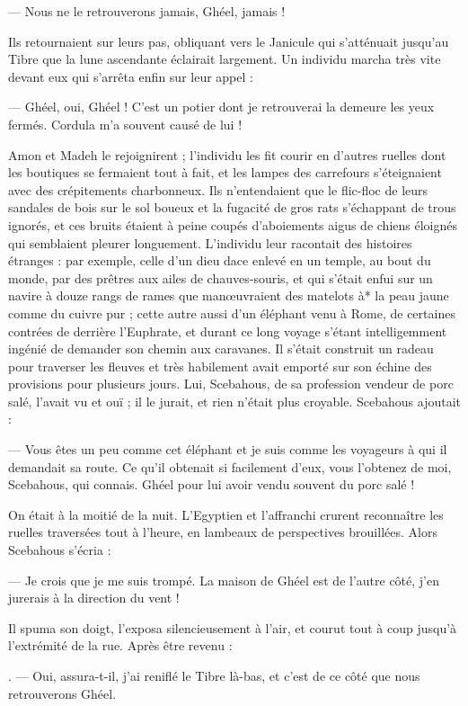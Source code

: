 \documentclass[a4paper, 11pt, oneside, polutonikogreek, french]{article}
\begin{document}
--- Nous ne le retrouverons jamais, Ghéel, jamais !

Ils retournaient sur leurs pas, obliquant vers le Janicule qui s'atténuait jusqu'au Tibre que la lune ascendante éclairait largement. Un individu marcha très vite devant eux qui s'arrêta enfin sur leur appel :

--- Ghéel, oui, Ghéel ! C'est un potier dont je retrouverai la demeure les yeux fermés. Cordula m'a souvent causé de lui !

Amon et Madeh le rejoignirent ; l'individu les fit courir en d'autres ruelles dont les boutiques se fermaient tout à fait, et les lampes des carrefours s'éteignaient avec des crépitements charbonneux. Ils n'entendaient que le flic-floc de leurs sandales de bois sur le sol boueux et la fugacité de gros rats s'échappant de trous ignorés, et ces bruits étaient à peine coupés d'aboiements aigus de chiens éloignés qui semblaient pleurer longuement. L'individu leur racontait des histoires étranges : par exemple, celle d'un dieu dace enlevé en un temple, au bout du monde, par des prêtres aux ailes de chauves-souris, et qui s'était enfui sur un navire à douze rangs de rames que manœuvraient des matelots à* la peau jaune comme du cuivre pur ; cette autre aussi d'un éléphant venu à Rome, de certaines contrées de derrière l'Euphrate, et durant ce long voyage s'étant intelligemment ingénié de demander son chemin aux caravanes. Il s'était construit un radeau pour traverser les fleuves et très habilement avait emporté sur son échine des provisions pour plusieurs jours. Lui, Scebahous, de sa profession vendeur de porc salé, l'avait vu et ouï ; il le jurait, et rien n'était plus croyable. Scebahous ajoutait :

--- Vous êtes un peu comme cet éléphant et je suis comme les voyageurs à qui il demandait sa route. Ce qu'il obtenait si facilement d'eux, vous l'obtenez de moi, Scebahous, qui connais. Ghéel pour lui avoir vendu souvent du porc salé !

On était à la moitié de la nuit. L'Egyptien et l'affranchi crurent reconnaître les ruelles traversées tout à l'heure, en lambeaux de perspectives brouillées. Alors Scebahous s'écria :

--- Je crois que je me suis trompé. La maison de Ghéel est de l'autre côté, j'en jurerais à la direction du vent !

Il spuma son doigt, l'exposa silencieusement à l'air, et courut tout à coup jusqu'à l'extrémité de la rue. Après être revenu :

. --- Oui, assura-t-il, j'ai reniflé le Tibre là-bas, et c'est de ce côté que nous retrouverons Ghéel.
\end{document}
